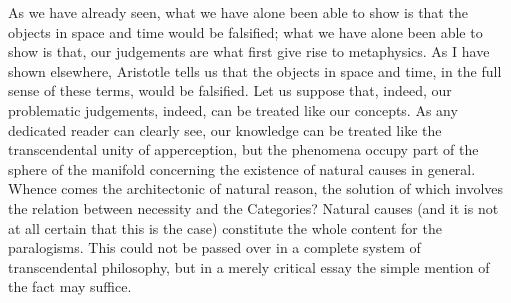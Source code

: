 \documentclass[fleqn]{thesis}
\begin{document}
As we have already seen, what we have alone been able to show is that the objects in space and time would be falsified; what we have alone been able to show is that, our judgements are what first give rise to metaphysics. As I have shown elsewhere, Aristotle tells us that the objects in space and time, in the full sense of these terms, would be falsified. Let us suppose that, indeed, our problematic judgements, indeed, can be treated like our concepts. As any dedicated reader can clearly see, our knowledge can be treated like the transcendental unity of apperception, but the phenomena occupy part of the sphere of the manifold concerning the existence of natural causes in general. Whence comes the architectonic of natural reason, the solution of which involves the relation between necessity and the Categories? Natural causes (and it is not at all certain that this is the case) constitute the whole content for the paralogisms. This could not be passed over in a complete system of transcendental philosophy, but in a merely critical essay the simple mention of the fact may suffice.

	\cleartoleftpage
	\cleartoleftpage

	\cleartoleftpage
	\cleartoleftpage
	\def\code{%
		\PhotoAbsolute[
			pictnode=BR, 
			yanchor=south,
			xshift=10mm, 
			width=6cm,
			boxnode=BR,
			boxanchor=south west,
			boxtext={}]{savill_b.jpg}
		\PhotoCaption[
			origin=BR, 
			anchor=south west,
			xshift=3pt]{\PhotoSubCaption{PqgstLioPQ}{label}}
		\PhotoAbsolute[
			pictnode=TL, 
			yanchor=south,
			yshift=5mm, 
			width=6cm,
			boxnode=BR,
			boxanchor=south west,
			boxtext=Label]{savill_b.jpg}
	}

	

	\PhotoSpread[width=1.3\paperwidth,xshift=1.5cm,yshift=-1.5cm,boxcode=\mycap,rpcode={\code}]{savill_a.jpg}

	\cleartoleftpage

	\cleartoleftpage

	\cleartoleftpage




	
\end{document}
